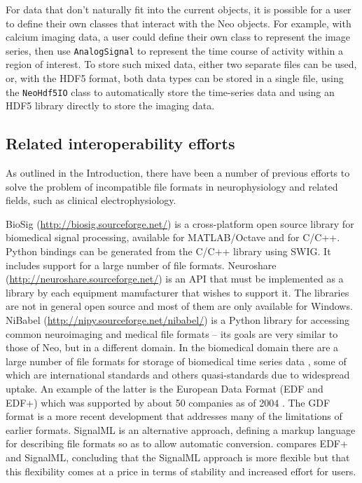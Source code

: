 \documentclass{frontiers}
\begin{document}
For data that don't naturally fit into the current objects, it is possible for a user to define their own classes that interact with the Neo objects. For example, with calcium imaging data, a user could define their own class to represent the image series, then use  \lstinline`AnalogSignal` to represent the time course of activity within a region of interest. To store such mixed data, either two separate files can be used, or, with the HDF5 format, both data types can be stored in a single file, using the \lstinline`NeoHdf5IO` class to automatically store the time-series data and using an HDF5 library directly to store the imaging data.


\subsection{Related interoperability efforts}

As outlined in the Introduction, there have been a number of previous efforts to solve the problem of incompatible file formats in neurophysiology and related fields, such as clinical electrophysiology.

BioSig (\url{http://biosig.sourceforge.net/}) is a cross-platform open source library for biomedical signal processing, available for MATLAB/Octave and for C/C++. 
Python bindings can be generated from the C/C++ library using SWIG. 
It includes support for a large number of file formats. 
Neuroshare (\url{http://neuroshare.sourceforge.net/}) is an API that must be implemented as a library by each equipment manufacturer that wishes to support it. 
The libraries are not in general open source and most of them are only available for Windows. 
NiBabel (\url{http://nipy.sourceforge.net/nibabel/}) is a Python library for accessing common neuroimaging and medical file formats -- its goals are very similar to those of Neo, but in a different domain. 
In the biomedical domain there are a large number of file formats for storage of biomedical time series data 
\citep[ECG, EEG, etc.; reviewed in][]{Schloegl2010}, some of which are international standards and others quasi-standards due to widespread uptake. An example of the latter is the European Data Format (EDF and EDF+) which was supported by about 50 companies as of 2004 \citep{Kemp2004}. The GDF format \citep{Schloegl2006} is a more recent development that addresses many of the limitations of earlier formats.
SignalML \citep{Durka2004} is an alternative approach, defining a markup language for describing file formats so as to allow automatic conversion. 
\citet{Kemp2004} compares EDF+ and SignalML, concluding that the SignalML approach is more flexible but that this flexibility comes at a price in terms of stability and increased effort for users.
\end{document}
